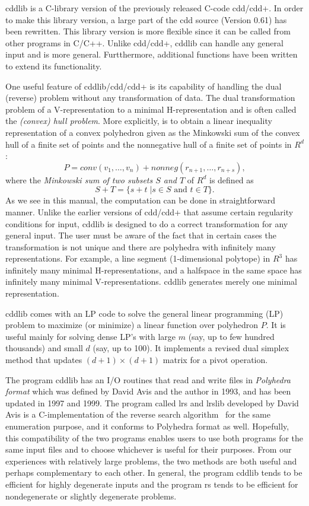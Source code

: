 \documentclass[11pt]{article}
\newcommand {\0} {{\bf 0}}
\begin{document}
cddlib is a C-library version of the previously released C-code cdd/cdd+.
In order to make this library version, a large part of the cdd source
(Version 0.61) has been rewritten.
This library version is more flexible since it can be called from other programs in C/C++.
Unlike cdd/cdd+, cddlib can handle any general input and is more general.
Furtthermore,  additional functions have been written to extend its functionality.

One useful feature of  cddlib/cdd/cdd+ is its capability
of handling the dual (reverse)  problem without any transformation
of data.  The dual transformation problem of a V-representation
to a minimal H-representation and is often called the 
{\em (convex) hull problem\/}.  More explicitly,
is to obtain a linear inequality representation
of a convex polyhedron given as the Minkowski sum of 
the convex hull of a finite set of points and the nonnegative
hull of a finite set of points in $R^{d}$: 
\[
P = conv(v_1,\ldots,v_n) +  nonneg(r_{n+1},\ldots,r_{n+s}), 
\]
where
 the {\em Minkowski sum of two subsets $S$ and $T$} of $R^{d}$ is defined
as 
\[
S + T = \{ s + t \; |  s \in S \mbox{ and } t \in T \}.
\]
As we see in this manual, the computation can be done
in straightforward manner.  Unlike the earlier versions of
cdd/cdd+ that assume certain regularity conditions for input, 
cddlib is designed to do a correct transformation for any general input.
The user must be aware of the fact that in certain cases the
transformation is not unique and there are polyhedra with
infinitely many representations.  For example, a line
segment (1-dimensional polytope) in $R^3$ has infinitely
many minimal H-representations, and a halfspace in the same space
has infinitely many minimal V-representations.  cddlib generates
merely one minimal representation.

cddlib comes with an LP code to solve the general
linear programming (LP) problem to maximize (or minimize) a linear
function over polyhedron $P$.   It is useful mainly for solving 
dense LP's with large $m$ (say, up to few hundred thousands) and small $d$ 
(say, up to 100).  It implements a revised dual simplex method that
updates $(d+1)\times (d+1)$ matrix for a pivot operation.

The program cddlib has an I/O routines that read and write files in 
{\em Polyhedra format\/} which was defined by David Avis and
the author in 1993, and has been updated in 1997 and 1999.  
The program called lrs and lrslib \cite{a-lrshome-01} developed by David Avis is
a C-implementation of the reverse search algorithm~\cite{af-pachv-92} 
for the same enumeration purpose, and it conforms to Polyhedra format as well.
Hopefully, this compatibility of the two programs
enables users to use both programs for the same input files
and to choose whichever is useful for their purposes.
From our experiences with relatively large problems,
the two methods are both useful and perhaps complementary
to each other.  In general, the program cddlib tends to be
efficient for highly degenerate inputs and the program rs
tends to be efficient for nondegenerate or slightly
degenerate problems.
\end{document}
